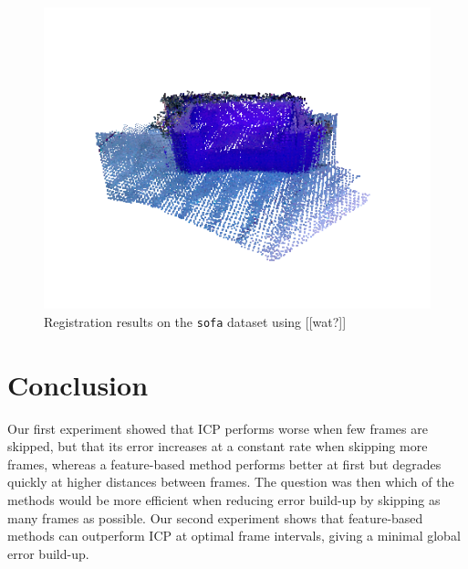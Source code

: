 \documentclass[a4paper]{article}
\begin{document}
\begin{figure}[htbp]
    \centering
        \includegraphics[width=\textwidth]{ims/sofa_results.png}
    \caption{Registration results on the \texttt{sofa} dataset using  [[wat?]]}
    \label{fig:sofa_results}
\end{figure}





\section{Conclusion}
Our first experiment showed that \ac{ICP} performs worse when few frames are skipped, but that its error increases at a constant rate when skipping more frames, whereas a feature-based method performs better at first but degrades quickly at higher distances between frames. The question was then which of the methods would be more efficient when reducing error build-up by skipping as many frames as possible. Our second experiment shows that feature-based methods can outperform \ac{ICP} at optimal frame intervals, giving a minimal global error build-up.
\end{document}
